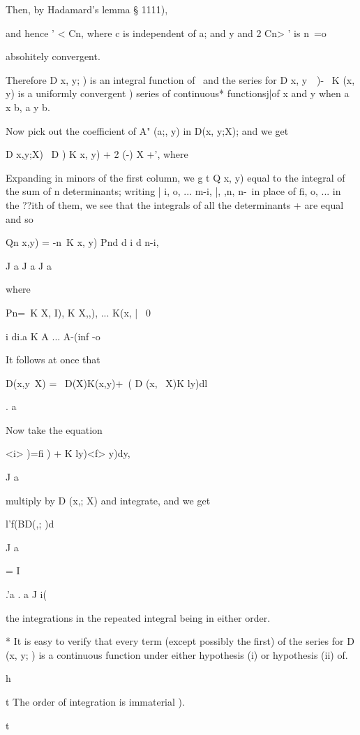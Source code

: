 %
%

Then, by Hadamard's lemma § 1111),

and hence ' < Cn, where c is independent of a; and y and 2 Cn> ' is n\
=o

absohitely convergent.

Therefore D x, y; ) is an integral function of \ and the series for D
x, y\ \ )- \ K (x, y) is a uniformly convergent ) series of
continuous* functionsj|of x and y when a x b, a y b.

Now pick out the coefficient of A" (a;, y) in D(x, y;X); and we get

D x,y;X) \ D ) K x, y) + 2 (-) X +', where

Expanding in minors of the first column, we g t Q x, y) equal to the
integral of the sum of n determinants; writing | i, o, ... m-i, |,
,n,   n-\ in place of fi, o, ... in the ??ith of them, we see that
the integrals of all the determinants + are equal and so

Qn x,y) = -n\ K x, y) Pnd d i    d n-i,

J a J a J a

where

Pn=\ K X, I), K X,,), ... K(x, | \ 0

i di.a K A ... A-(inf -o

It follows at once that

D(x,y\ X) = \ D(X)K(x,y)+\ ( D (x, \ X)K ly)dl

. a

Now take the equation

<i> )=fi ) + \' K ly)<f> y)dy,

J a

multiply by D (x,; X) and integrate, and we get

l'f(BD(,; )d

J a

= I %

.'a . a J i(

the integrations in the repeated integral being in either order.

* It is easy to verify that every term (except possibly the first) of
the series for D (x, y; ) is a continuous function under either
hypothesis (i) or hypothesis (ii) of.

h

t The order of integration is immaterial ).

t

